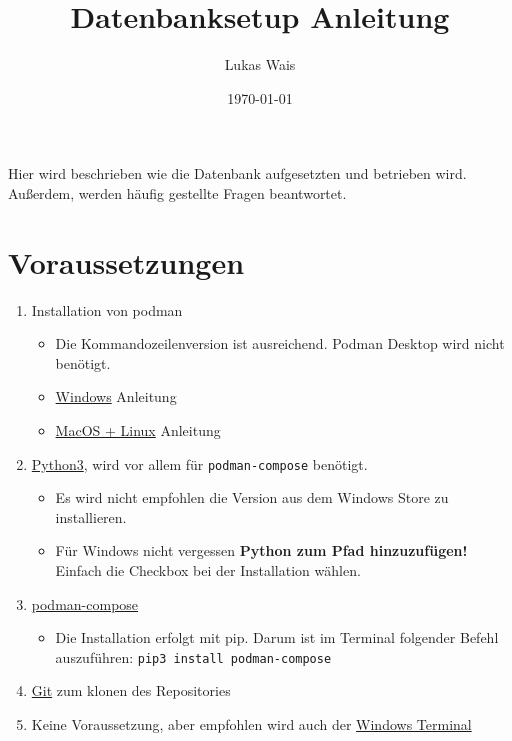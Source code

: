 \documentclass[12pt, a4paper]{article}
\title{Datenbanksetup Anleitung}
\author{Lukas Wais}
\date{\today}
\begin{document}
\maketitle

Hier wird beschrieben wie die Datenbank aufgesetzten und betrieben wird. \\
Außerdem, werden häufig gestellte Fragen beantwortet.

\section*{Voraussetzungen}
\begin{enumerate}
    \item Installation von podman
          \begin{itemize}
              \item Die Kommandozeilenversion ist ausreichend. Podman Desktop wird nicht benötigt.
              \item \href{https://github.com/containers/podman/blob/main/docs/tutorials/podman-for-windows.md}{Windows} Anleitung
              \item \href{https://podman.io/getting-started/installation}{MacOS + Linux} Anleitung
          \end{itemize}
    \item \href{https://www.python.org/downloads/}{Python3}, wird vor allem für \texttt{podman-compose} benötigt.
          \begin{itemize}
              \item Es wird nicht empfohlen die Version aus dem Windows Store zu installieren.
              \item Für Windows nicht vergessen \textbf{Python zum Pfad hinzuzufügen!} Einfach die Checkbox bei der Installation wählen.
          \end{itemize}
    \item \href{https://github.com/containers/podman-compose}{podman-compose}
          \begin{itemize}
              \item Die Installation erfolgt mit pip. Darum ist im Terminal folgender Befehl auszuführen: \texttt{pip3 install podman-compose}
          \end{itemize}
    \item \href{https://git-scm.com/}{Git} zum klonen des Repositories
    \item  Keine Voraussetzung, aber empfohlen wird auch der \href{https://github.com/microsoft/terminal}{Windows Terminal}
\end{enumerate}
\end{document}
